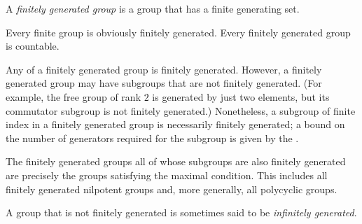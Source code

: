\documentclass{article}
\begin{document}

A \emph{finitely generated group} is a group that has a finite generating set.

Every finite group is obviously finitely generated.
Every finitely generated group is countable.

Any 
of a finitely generated group is finitely generated.
However, a finitely generated group may have subgroups
that are not finitely generated.
(For example, the free group of rank $2$ is generated by just two elements,
but its commutator subgroup is not finitely generated.)
Nonetheless, a subgroup of finite index in a finitely generated group
is necessarily finitely generated;
a bound on the number of generators required for the subgroup is given by
the .

The finitely generated groups
all of whose subgroups are also finitely generated
are precisely the groups satisfying the maximal condition.
This includes all finitely generated nilpotent groups and,
more generally, all polycyclic groups.

A group that is not finitely generated
is sometimes said to be \emph{infinitely generated}.
\end{document}
